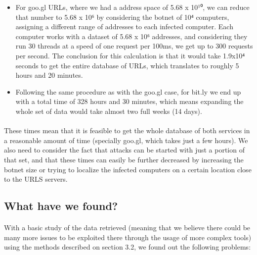\documentclass[12pt]{article}
\begin{document}
\begin{itemize}

\item  For goo.gl URLs, where we had a address space of 5.68 x 10¹⁰, we can reduce that number to 5.68 x 10⁶ by considering the botnet of 10⁴ computers, assigning a different range of addresses to each infected computer. Each computer works with a dataset of 5.68 x 10⁶ addresses, and considering they run 30 threads at a speed of one request per 100ms, we get up to 300 requests per second. The conclusion for this calculation is that it would take 1.9x10⁴ seconds to get the entire database of URLs, which translates to roughly 5 hours and 20 minutes.

\item  Following the same procedure as with the goo.gl case, for bit.ly we end up with a total time of 328 hours and 30 minutes, which means expanding the whole set of data would take almost two full weeks (14 days).

\end{itemize}

\paragraph{}
These times mean that it is feasible to get the whole database of both services in a reasonable amount of time (specially goo.gl, which takes just a few hours). We also need to consider the fact that attacks can be started with just a portion of that set, and that these times can easily be further decreased by increasing the botnet size or trying to localize the infected computers on a certain location close to the URLS servers.

\subsection{What have we found?}

\paragraph{}
With a basic study of the data retrieved (meaning that we believe there could be many more issues to be exploited there through the usage of more complex tools) using the methods described on section 3.2, we found out the following problems:
\end{document}
